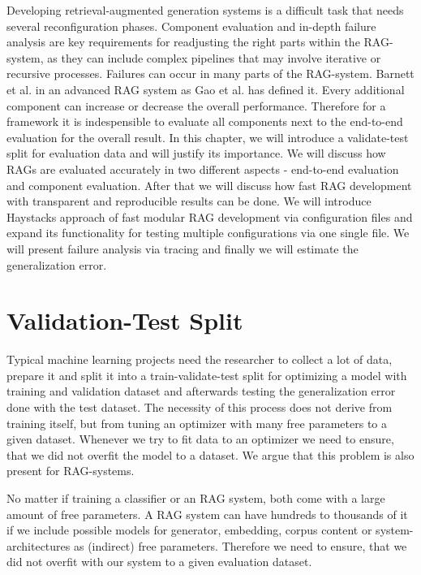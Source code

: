 
Developing retrieval-augmented generation systems is a difficult task that needs several reconfiguration phases.\cite{Simon.10112024} Component evaluation and in-depth failure analysis are key requirements for readjusting the right parts within the RAG-system, as they can include complex pipelines that may involve iterative or recursive processes. Failures can occur in many parts of the RAG-system. Barnett et al.\cite{Barnett.2024} in an advanced RAG system as Gao et al.\cite{Gao.18.12.2023} has defined it. Every additional component can increase or decrease the overall performance. Therefore for a framework it is indespensible to evaluate all components next to the end-to-end evaluation for the overall result. In this chapter, we will introduce a validate-test split for evaluation data and will justify its importance. We will discuss how RAGs are evaluated accurately in two different aspects - end-to-end evaluation and component evaluation. After that we will discuss how fast RAG development with transparent and reproducible results can be done. We will introduce Haystacks approach of fast modular RAG development via configuration files and expand its functionality for testing multiple configurations via one single file. We will present failure analysis via tracing and finally we will estimate the generalization error.

\section{Validation-Test Split}
Typical machine learning projects need the researcher to collect a lot of data, prepare it and split it into a train-validate-test split for optimizing a model with training and validation dataset and afterwards testing the generalization error done with the test dataset. The necessity of this process does not derive from training itself, but from tuning an optimizer with many free parameters to a given dataset. Whenever we try to fit data to an optimizer we need to ensure, that we did not overfit the model to a dataset. We argue that this problem is also present for RAG-systems.

No matter if training a classifier or an RAG system, both come with a large amount of free parameters. A RAG system can have hundreds to thousands of it if we include possible models for generator, embedding, corpus content or system-architectures as (indirect) free parameters. Therefore we need to ensure, that we did not overfit with our system to a given evaluation dataset. 

